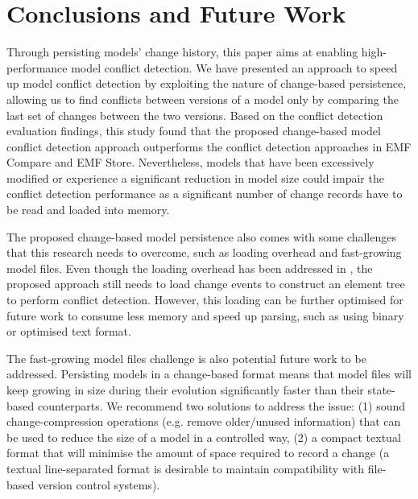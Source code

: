 \section{Conclusions and Future Work}
\label{sec:conclusions_and_future_work}
Through persisting models' change history, this paper aims at enabling high-performance model conflict detection. We have presented an approach to speed up model conflict detection by exploiting the nature of change-based persistence, allowing us to find conflicts between versions of a model only by comparing the last set of changes between the two versions. Based on the conflict detection evaluation findings, this study found that the proposed change-based model conflict detection approach outperforms the conflict detection approaches in EMF Compare and EMF Store. Nevertheless, models that have been excessively modified or experience a significant reduction in model size could impair the conflict detection performance as a significant number of change records have to be read and loaded into memory. 

The proposed change-based model persistence also comes with some challenges that this research needs to overcome, such as loading overhead and fast-growing model files. Even though the loading overhead has been addressed in \cite{DBLP:conf/models/YohannisRPK18}, the proposed approach still needs to load change events to construct an element tree to perform conflict detection. However, this loading can be further optimised for future work to consume less memory and speed up parsing, such as using binary or optimised text format.

The fast-growing model files challenge is also potential future work to be addressed. Persisting models in a change-based format means that model files will keep growing in size during their evolution significantly faster than their state-based counterparts. We recommend two solutions to address the issue: (1) sound change-compression operations (e.g. remove older/unused information) that can be used to reduce the size of a model in a controlled way, (2) a compact textual format that will minimise the amount of space required to record a change (a textual line-separated format is desirable to maintain compatibility with file-based version control systems). 

